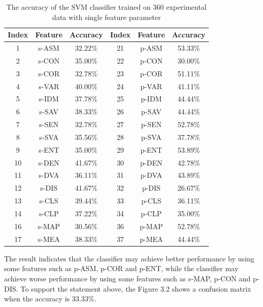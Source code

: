 \begin{table}[!t]
\begin{center}
\renewcommand{\arraystretch}{0.5}
\begin{tabular}{||c c c c c c ||}
\hline
Index & Feature & Accuracy & Index & Feature & Accuracy \\[0.7ex]
\hline\hline
1 & s-ASM & 32.22\% & 21 & p-ASM & 53.33\% \\
2 & s-CON & 35.00\% & 22 & p-CON & 30.00\% \\
3 & s-COR & 32.78\% & 23 & p-COR & 51.11\% \\
4 & s-VAR & 40.00\% & 24 & p-VAR & 41.11\% \\
5 & s-IDM & 37.78\% & 25 & p-IDM & 44.44\% \\
6 & s-SAV & 38.33\% & 26 & p-SAV & 44.44\% \\
7 & s-SEN & 32.78\% & 27 & p-SEN & 52.78\% \\
8 & s-SVA & 35.56\% & 28 & p-SVA & 37.78\% \\
9 & s-ENT & 35.00\% & 29 & p-ENT & 53.89\% \\
10 & s-DEN & 41.67\% & 30 & p-DEN & 42.78\% \\
11 & s-DVA & 36.11\% & 31 & p-DVA & 43.89\% \\
12 & s-DIS & 41.67\% & 32 & p-DIS & 26.67\% \\
13 & s-CLS & 39.44\% & 33 & p-CLS & 36.11\% \\
14 & s-CLP & 37.22\% & 34 & p-CLP & 35.00\% \\
16 & s-MAP & 30.56\% & 36 & p-MAP & 52.78\% \\
17 & s-MEA & 38.33\% & 37 & p-MEA & 44.44\% \\
\hline
\end{tabular}
\caption {The accuracy of the SVM classifier trained on 360 experimental data with single feature parameter}
\end{center}
\end{table}
The result indicates that the classifier may achieve better performance by using some features such as p-ASM, p-COR and p-ENT, while the classifier may achieve worse performance by using some features such as s-MAP, p-CON and p-DIS. To support the statement above, the Figure 3.2 shows a confusion matrix when the accuracy is 33.33\%. 
